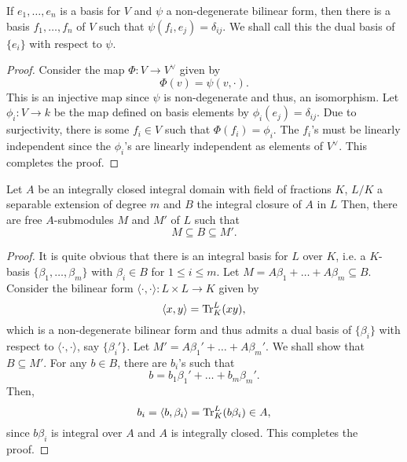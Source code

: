 \begin{lemma}
    If $e_1,\dots,e_n$ is a basis for $V$ and $\psi$ a non-degenerate bilinear form, then there is a basis $f_1,\dots,f_n$ of $V$ such that $\psi(f_i, e_j) = \delta_{ij}$. We shall call this the dual basis of $\{e_i\}$ with respect to $\psi$.
\end{lemma}
\begin{proof}
    Consider the map $\Phi: V\to V^\vee$ given by 
    \begin{equation*}
        \Phi(v) = \psi(v,\cdot).
    \end{equation*}
    This is an injective map since $\psi$ is non-degenerate and thus, an isomorphism. Let $\phi_i: V\to k$ be the map defined on basis elements by $\phi_i(e_j) = \delta_{ij}$. Due to surjectivity, there is some $f_i\in V$ such that $\Phi(f_i) = \phi_i$. The $f_i$'s must be linearly independent since the $\phi_i$'s are linearly independent as elements of $V^\vee$. This completes the proof.
\end{proof}

\begin{theorem}
    Let $A$ be an integrally closed integral domain with field of fractions $K$, $L/K$ a separable extension of degree $m$ and $B$ the integral closure of $A$ in $L$ Then, there are free $A$-submodules $M$ and $M'$ of $L$ such that 
    \begin{equation*}
        M\subseteq B\subseteq M'.
    \end{equation*}
\end{theorem}
\begin{proof}
    It is quite obvious that there is an integral basis for $L$ over $K$, i.e. a $K$-basis $\{\beta_1,\dots,\beta_m\}$ with $\beta_i\in B$ for $1\le i\le m$. Let $M = A\beta_1 + \dots + A\beta_m\subseteq B$. Consider the bilinear form $\langle\cdot,\cdot\rangle: L\times L\to K$ given by 
    \begin{equation*}
        \langle x,y\rangle = \operatorname{Tr}^L_K(xy),
    \end{equation*}
    which is a non-degenerate bilinear form and thus admits a dual basis of $\{\beta_i\}$ with respect to $\langle\cdot,\cdot\rangle$, say $\{\beta_i'\}$. Let $M' = A\beta_1' + \dots + A\beta_m'$. We shall show that $B\subseteq M'$. For any $b\in B$, there are $b_i$'s such that 
    \begin{equation}
        b = b_1\beta_1' + \dots + b_m\beta_m'.
    \end{equation}
    Then, 
    \begin{equation*}
        b_i = \langle b, \beta_i\rangle = \operatorname{Tr}^L_K(b\beta_i)\in A,
    \end{equation*}
    since $b\beta_i$ is integral over $A$ and $A$ is integrally closed. This completes the proof.
\end{proof}

